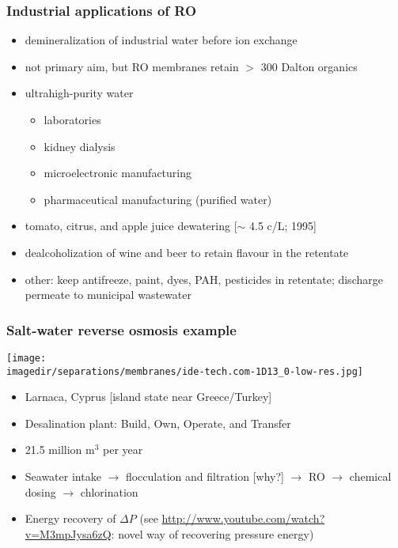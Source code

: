 \begin{frame}\frametitle{Industrial applications of RO}
	\begin{itemize}
		\item	demineralization of industrial water before ion exchange
		\item	not primary aim, but RO membranes retain $>$ 300 Dalton organics %
		\item	ultrahigh-purity water
		 	\begin{itemize}
		 		\item	laboratories
		 		\item	kidney dialysis
		 		\item	microelectronic manufacturing
		 		\item	pharmaceutical manufacturing (purified water)
		 	\end{itemize}
		 \item	tomato, citrus, and apple juice dewatering [$\sim$ 4.5 c/L; 1995]
		 \item	dealcoholization of wine and beer to retain flavour in the retentate
		 \item	other: keep antifreeze, paint, dyes, PAH, pesticides in retentate; discharge permeate to municipal wastewater %
	\end{itemize}
\end{frame}

\begin{frame}\frametitle{Salt-water reverse osmosis example}
	\texttt{[image: \\imagedir/separations/membranes/ide-tech.com-1D13\_0-low-res.jpg]}
	\begin{itemize}
		\item	Larnaca, Cyprus [island state near Greece/Turkey]
		\item	Desalination plant: Build, Own, Operate, and Transfer
		\item	21.5 million $\text{m}^3$ per year
		\item	Seawater intake $\rightarrow$ flocculation and filtration [why?] $\rightarrow$ RO $\rightarrow$ chemical dosing $\rightarrow$ chlorination
		\item	Energy recovery of $\Delta P$ {\tiny (see \href{http://www.youtube.com/watch?v=M3mpJysa6zQ}{http://www.youtube.com/watch?v=M3mpJysa6zQ}: novel way of recovering pressure energy)}
	\end{itemize}
\end{frame}

